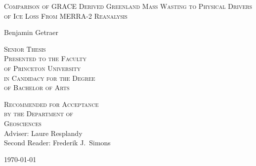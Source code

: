 \thispagestyle{empty}
  \begin{center}
    \textsc{\LARGE Comparison of GRACE Derived Greenland Mass Wasting to Physical Drivers of Ice Loss From MERRA-2 Reanalysis} 
  \end{center}
  \vspace{.6in}
  \begin{center}
    Benjamin Getraer 
  \end{center}
  \vspace{.6in}
  \begin{center}
    \textsc{Senior Thesis \\ 
    Presented to the Faculty \\
    of Princeton University \\
    in Candidacy for the Degree \\
    of Bachelor of Arts}
  \end{center}
  \vspace{.3in}
  \begin{center}
    \textsc{Recommended for Acceptance \\
    by the Department of \\
    Geosciences \\}
    Adviser: Laure Resplandy \\
    Second Reader: Frederik J.~Simons \\
  \end{center}
  \vspace{.3in}
  \begin{center}
\today
  \end{center}
  
  \clearpage